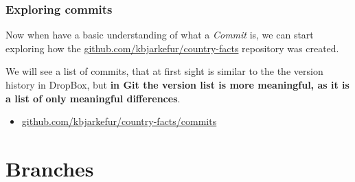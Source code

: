 \documentclass[aspectratio=169]{beamer} %
\newcommand{\trainingURL}[1]{{\color{blue}\url{#1}}}
\newcommand{\traininerUsername}{kbjarkefur}
\newcommand{\repoName}{\traininerUsername/country-facts}
\newcommand{\trainingRepoURL}[1]{\trainingURL{github.com/\repoName #1}}
\begin{document}
\begin{frame}
	\frametitle{Exploring commits}

	Now when have a basic understanding of what a \textit{Commit} is, we can start exploring how the \trainingRepoURL{} repository was created.

	\vspace{.25cm}

	We will see a list of commits, that at first sight is similar to the the version history in DropBox, but \textbf{in Git the version list is more meaningful, as it is a list of only meaningful differences}.

	\vspace{.25cm}

	\begin{itemize}
		\item \trainingRepoURL{/commits}
	\end{itemize}

\end{frame}

\section{Branches}
\end{document}
